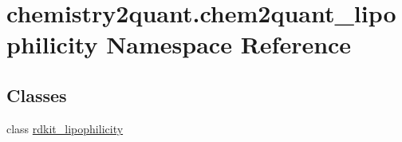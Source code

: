 \hypertarget{namespacechemistry2quant_1_1chem2quant__lipophilicity}{}\section{chemistry2quant.\+chem2quant\+\_\+lipophilicity Namespace Reference}
\label{namespacechemistry2quant_1_1chem2quant__lipophilicity}
\subsection*{Classes}
\begin{DoxyCompactItemize}
\item 
class \hyperlink{classchemistry2quant_1_1chem2quant__lipophilicity_1_1rdkit__lipophilicity}{rdkit\+\_\+lipophilicity}
\end{DoxyCompactItemize}
